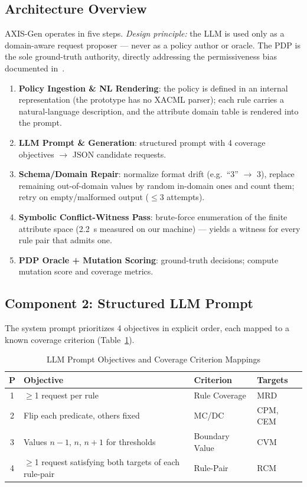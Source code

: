 \documentclass[conference]{IEEEtran}
\begin{document}
\subsection{Architecture Overview}

AXIS-Gen operates in five steps. \textit{Design principle:} the LLM is used
only as a domain-aware request proposer --- never as a policy author or oracle.
The PDP is the sole ground-truth authority, directly addressing the
permissiveness bias documented in~\cite{b12}.

\begin{enumerate}
  \item \textbf{Policy Ingestion \& NL Rendering}: the policy is defined in an
    internal representation (the prototype has no XACML parser); each rule
    carries a natural-language description, and the attribute domain table is
    rendered into the prompt.
  \item \textbf{LLM Prompt \& Generation}: structured prompt with 4 coverage
    objectives $\to$ JSON candidate requests.
  \item \textbf{Schema/Domain Repair}: normalize format drift (e.g.\ ``3''
    $\to$ 3), replace remaining out-of-domain values by random in-domain
    ones and count them; retry on empty/malformed output ($\leq$3 attempts).
  \item \textbf{Symbolic Conflict-Witness Pass}: brute-force enumeration of the
    finite attribute space (2.2~s measured on our machine) --- yields a witness
    for every rule pair that admits one.
  \item \textbf{PDP Oracle + Mutation Scoring}: ground-truth decisions; compute
    mutation score and coverage metrics.
\end{enumerate}

\subsection{Component 2: Structured LLM Prompt}

The system prompt prioritizes 4 objectives in explicit order, each mapped to a
known coverage criterion (Table~\ref{tab:prompt}).

\begin{table}[htbp]
\caption{LLM Prompt Objectives and Coverage Criterion Mappings}
\label{tab:prompt}
\begin{center}
\begin{tabular}{|c|p{1.8cm}|p{1.5cm}|p{1.3cm}|}
\hline
\textbf{P} & \textbf{Objective} & \textbf{Criterion} & \textbf{Targets} \\
\hline
1 & $\geq$1 request per rule & Rule Coverage \cite{b4} & MRD \\
\hline
2 & Flip each predicate, others fixed & MC/DC \cite{b4,b6} & CPM, CEM \\
\hline
3 & Values $n{-}1$, $n$, $n{+}1$ for thresholds & Boundary Value & CVM \\
\hline
4 & $\geq$1 request satisfying both targets of each rule-pair & Rule-Pair \cite{b4} & RCM \\
\hline
\end{tabular}
\end{center}
\end{table}
\end{document}
